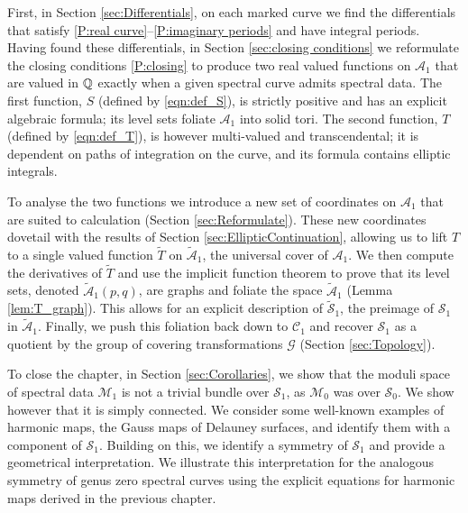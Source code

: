 First, in Section \ref{sec:Differentials}, on each marked curve we find the differentials that satisfy \ref{P:real curve}--\ref{P:imaginary periods} and have integral periods. Having found these differentials, in Section \ref{sec:closing conditions} we reformulate the closing conditions \ref{P:closing} to produce two real valued functions on $\mathcal{A}_1$ that are valued in $\Q$ exactly when a given spectral curve admits spectral data. The first function, $S$ (defined by \eqref{eqn:def_S}), is strictly positive and has an explicit algebraic formula; its level sets foliate $\mathcal{A}_1$ into solid tori. The second function, $T$ (defined by \eqref{eqn:def_T}), is however multi-valued and transcendental; it is dependent on paths of integration on the curve, and its formula contains elliptic integrals.

To analyse the two functions we introduce a new set of coordinates on $\mathcal{A}_1$ that are suited to calculation (Section \ref{sec:Reformulate}). These new coordinates dovetail with the results of Section \ref{sec:EllipticContinuation}, allowing us to lift $T$ to a  single valued function $\tilde{T}$ on $\mathcal{\tilde{A}}_1$, the universal cover of $\mathcal{A}_1$.
We then compute the derivatives of $\tilde{T}$ and use the implicit function theorem to prove that its level sets, denoted $\mathcal{\tilde{A}}_1(p,q)$, are graphs and foliate the space $\mathcal{\tilde{A}}_1$ (Lemma \ref{lem:T_graph}). This allows for an explicit description of $\mathcal{\tilde{S}}_1$, the preimage of $\mathcal{S}_1$ in $\mathcal{\tilde{A}}_1$.
Finally, we push this foliation back down to $\mathcal{C}_1$ and recover $\mathcal{S}_1$ as a quotient by the group of covering transformations $\mathcal{G}$ (Section \ref{sec:Topology}).

To close the chapter, in Section \ref{sec:Corollaries}, we show that the moduli space of spectral data $\mathcal{M}_1$ is not a trivial bundle over $\mathcal{S}_1$, as $\mathcal{M}_0$ was over $\mathcal{S}_0$. We show however that it is simply connected. We consider some well-known examples of harmonic maps, the Gauss maps of Delauney surfaces, and identify them with a component of $\mathcal{S}_1$. Building on this, we identify a symmetry of $\mathcal{S}_1$ and provide a geometrical interpretation. We illustrate this interpretation for the analogous symmetry of genus zero spectral curves using the explicit equations for harmonic maps derived in the previous chapter.


